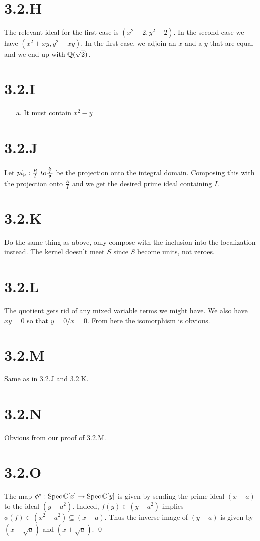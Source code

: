 \documentclass{article}
\begin{document}
\section{3.2.H}
The relevant ideal for the first case is $(x^2-2, y^2-2)$. In the second
case we have $(x^2+xy,y^2+xy)$. In the first case, we adjoin an
$x$ and a $y$ that are equal and we end
up with $\mathbb{Q}(\sqrt{2})$.

\section{3.2.I}
\begin{itemize}
    \item[a.] It must contain $x^2-y$
\end{itemize}

\section{3.2.J}
Let $pi_{\mathfrak{p}} : \frac{R}{I} \ to
    \frac{\frac{R}{I}}{\mathfrak{p}}$ be the projection onto the integral domain.
Composing this with the projection onto $\frac{R}{I}$ and we get the
desired prime ideal containing $I$.

\section{3.2.K}
Do the same thing as above, only compose with the inclusion into the
localization instead. The kernel doesn't meet $S$ since
$S$ become units, not zeroes.

\section{3.2.L}
The quotient gets rid of any mixed variable terms we might have. We also have
$xy=0$ so that $y=0/x=0$. From here the
isomorphism is obvious.

\section{3.2.M}
Same as in 3.2.J and 3.2.K.

\section{3.2.N}
Obvious from our proof of 3.2.M.

\section{3.2.O}
The map $\phi^* : \operatorname{Spec}\mathbb{C}[x] \to \operatorname{Spec}\mathbb{C}[y]$ is given by sending the prime ideal
$(x-a)$ to the ideal $(y-a^2)$. Indeed,
$f(y) \in (y-a^2)$ implies $\phi(f) \in (x^2-a^2) \subseteq (x-a)$. Thus the inverse image
of $(y-a)$ is given by $(x-\sqrt{a})$ and
$(x+\sqrt{a})$. \qed
\end{document}
